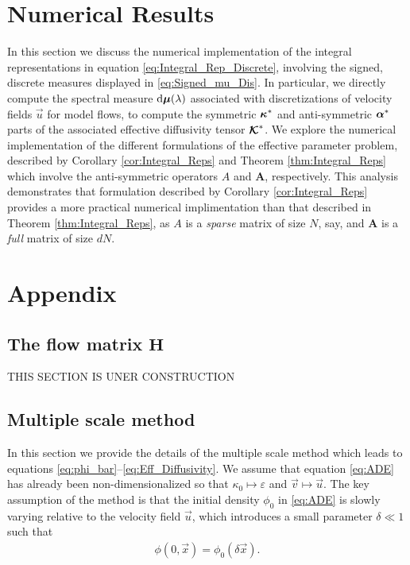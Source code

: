 \documentclass[11pt]{amsart}
\renewcommand{\d}{\mathrm{d}}
\newcommand{\Hb}{\mathbf{H}}
\newcommand{\Ab}{\mathbf{A}}
\newcommand\Kbc{\mbox{\boldmath${\mathcal{K}}$}}
\newcommand\bmu{\mbox{\boldmath${\mu}$}}
\newcommand\balpha{\mbox{\boldmath${\alpha}$}}
\newcommand\bkappa{\mbox{\boldmath${\kappa}$}}
\begin{document}
\section{Numerical Results}\label{sec:Num_Results}
%
In this section we discuss the numerical implementation of the
integral representations in equation \eqref{eq:Integral_Rep_Discrete},
involving the signed, discrete measures displayed in
\eqref{eq:Signed_mu_Dis}. In particular, we directly compute the
spectral measure $\d\bmu(\lambda)$ associated with discretizations of
velocity fields $\vec{u}$ for model flows, to compute the symmetric
$\bkappa^*$ and anti-symmetric $\balpha^*$ parts of the associated
effective diffusivity tensor $\Kbc^*$. We explore the numerical
implementation of the different formulations of the effective
parameter problem, described by Corollary \ref{cor:Integral_Reps} and
Theorem \ref{thm:Integral_Reps} which involve the anti-symmetric
operators $A$ and $\Ab$, respectively. This analysis demonstrates that
formulation described by Corollary \ref{cor:Integral_Reps} provides a
more practical numerical implimentation than that described in Theorem
\ref{thm:Integral_Reps}, as $A$ is a \emph{sparse} matrix of size $N$,
say, and $\Ab$ is a \emph{full} matrix of size $dN$.    


  \setcounter{equation}{1}  %
  \setcounter{section}{0}  %
  \renewcommand{\theequation}{A-\arabic{equation}} 
\renewcommand{\thesection}{A-\arabic{section}}
%
\section{Appendix} 
\label{sec:Appendix}
%
\subsection{The flow matrix $\Hb$}\label{eq:flow_matrix}
%
THIS SECTION IS UNER CONSTRUCTION
%
\subsection{Multiple scale method}\label{sec:Multiscal_Method}
%
In this section we provide the details of the multiple scale method
\cite{McLaughlin:SIAM_JAM:780,Papanicolaou:1981:36:8,Papanicolaou:RF-835,Bensoussan:Book:1978}
which leads to equations
\eqref{eq:phi_bar}--\eqref{eq:Eff_Diffusivity}. We assume that
equation \eqref{eq:ADE} has already been non-dimensionalized so that
$\kappa_0\mapsto\varepsilon$ and $\vec{v}\mapsto\vec{u}$. The key assumption of the method is
that the initial density $\phi_0$ in \eqref{eq:ADE} is slowly
varying relative to the velocity field $\vec{u}$, which introduces a
small parameter $\delta\ll1$ such that  
% 
\begin{align}\label{eq:IC}
  \phi(0,\vec{x})=\phi_0(\delta\vec{x}).
\end{align}
%
\end{document}
